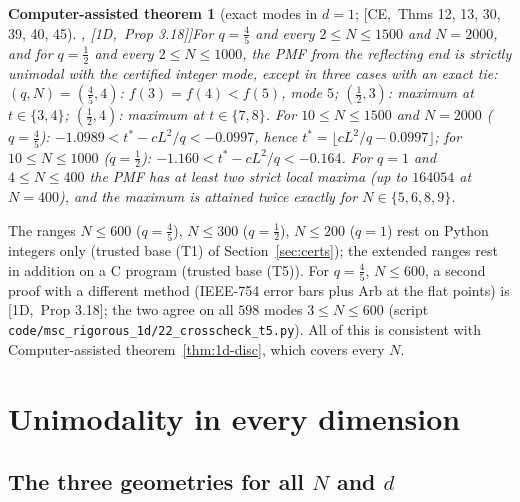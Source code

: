 \documentclass[10pt,a4paper]{article}
\theoremstyle{plain}
\newtheorem{catheorem}[theorem]{Computer-assisted theorem}
\theoremstyle{definition}
\newcommand{\src}[2]{[\textsf{#1},~#2]}           %
\newcommand{\ONE}{\textsf{1D}}
\newcommand{\CER}{\textsf{CE}}
\begin{document}
\begin{catheorem}[exact modes in $d=1$; \src{\CER}{Thms 12, 13, 30, 39, 40, 45}, \src{\ONE}{Prop 3.18}]\label{thm:1d-certified}
For $q=\frac45$ and every $2\le N\le1500$ and $N=2000$, and for $q=\frac12$ and every $2\le N\le1000$, the PMF from the reflecting end is strictly unimodal with the certified integer mode, except in three cases with an exact tie: $(q,N)=(\frac45,4)$: $f(3)=f(4)<f(5)$, mode $5$; $(\frac12,3)$: maximum at $t\in\{3,4\}$; $(\frac12,4)$: maximum at $t\in\{7,8\}$. For $10\le N\le1500$ and $N=2000$ ($q=\frac45$): $-1.0989<t^*-cL^2/q<-0.0997$, hence $t^*=\lfloor cL^2/q-0.0997\rfloor$; for $10\le N\le1000$ ($q=\frac12$): $-1.160<t^*-cL^2/q<-0.164$. For $q=1$ and $4\le N\le400$ the PMF has at least two strict local maxima (up to $164054$ at $N=400$), and the maximum is attained twice exactly for $N\in\{5,6,8,9\}$.
\end{catheorem}
The ranges $N\le600$ ($q=\frac45$), $N\le300$ ($q=\frac12$), $N\le200$ ($q=1$) rest on Python integers only (trusted base (T1) of Section~\ref{sec:certs}); the extended ranges rest in addition on a C program (trusted base (T5)). For $q=\frac45$, $N\le600$, a second proof with a different method (IEEE-754 error bars plus Arb at the flat points) is \src{\ONE}{Prop 3.18}; the two agree on all $598$ modes $3\le N\le600$ (script \texttt{code/msc\_rigorous\_1d/22\_crosscheck\_t5.py}). All of this is consistent with Computer-assisted theorem~\ref{thm:1d-disc}, which covers every $N$.

\section{Unimodality in every dimension}\label{sec:unimodal}

\subsection{The three geometries for all $N$ and $d$}
\end{document}
